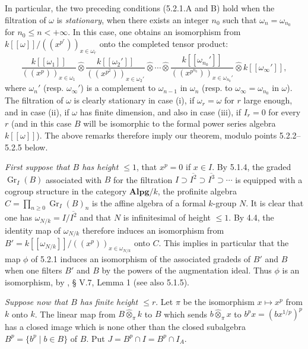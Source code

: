 \label{VIIB.5.2.1.C}In particular, the two preceding conditions (5.2.1.A and B) hold when the filtration of $\omega$ is \emph{stationary}, \ie when there exists an integer $n_0$ such that $\omega_n=\omega_{n_0}$ for $n_0\le n<+\infty$. In this case, one obtains an isomorphism from $k[[\omega]]/((x^{p^r}))_{x\in\omega_r}$ onto the completed tensor product:
\[
\frac{k[[\omega_1]]}{((x^p))_{x\in\omega_1}}\widehat\otimes
\frac{k[[\omega_2']]}{((x^{p^2}))_{x\in\omega_2'}}\widehat\otimes\cdots\widehat\otimes
\frac{k[[\omega_{n_0}']]}{((x^{p^{n_0}}))_{x\in\omega_{n_0}'}}\widehat\otimes k[[\omega_\infty']],
\]
where $\omega_n'$ (resp. $\omega_\infty'$) is a complement to $\omega_{n-1}$ in $\omega_n$ (resp. to $\omega_\infty=\omega_{n_0}$ in $\omega$). The filtration of $\omega$ is clearly stationary in case (i), \ie if $\omega_r=\omega$ for $r$ large enough, and in case (ii), \ie if $\omega$ has finite dimension, and also in case (iii), \ie if $I_r=0$ for every $r$ (and in this case $B$ will be isomorphic to the formal power series algebra $k[[\omega]]$). The above remarks therefore imply our theorem, modulo points 5.2.2--5.2.5 below.

\emph{First suppose that $B$ has height $\le1$}, \ie that $x^p=0$ if $x\in I$. By 5.1.4, the graded $\operatorname{Gr}_I(B)$ associated with $B$ for the filtration $I\supset\overline{I^2}\supset\overline{I^3}\supset\cdots$ is equipped with a cogroup structure in the category $\mathbf{Alpg}/k$, \ie the profinite algebra $C=\prod_{n\ge0}\operatorname{Gr}_I(B)_n$ is the affine algebra of a formal $k$-group $N$. It is clear that one has $\omega_{N/k}=I/\overline{I^2}$ and that $N$ is infinitesimal of height $\le1$. By 4.4, the identity map of $\omega_{N/k}$ therefore induces an isomorphism from $B'=k[[\omega_{N/k}]]/((x^p))_{x\in\omega_{N/k}}$ onto $C$. This implies in particular that the map $\phi$ of 5.2.1 induces an isomorphism of the associated gradeds of $B'$ and $B$ when one filters $B'$ and $B$ by the powers of the augmentation ideal. Thus $\phi$ is an isomorphism, by \cite{CA}, § V.7, Lemma 1 (see also 5.1.5).

\emph{Suppose now that $B$ has finite height $\le r$}. Let $\pi$ be the isomorphism $x\mapsto x^p$ from $k$ onto $k$. The linear map from $B\widehat\otimes_\pi k$ to $B$ which sends $b\widehat\otimes_\pi x$ to $b^px=(bx^{1/p})^p$ has a closed image which is none other than the closed subalgebra $B^p=\{b^p\mid b\in B\}$ of $B$. Put $J=B^p\cap I=B^p\cap I_A$.

